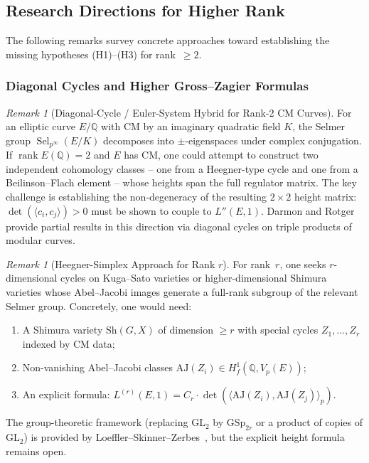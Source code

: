 \documentclass[aps,prd,twocolumn,superscriptaddress,nofootinbib,floatfix]{revtex4-2}
\theoremstyle{definition}
\theoremstyle{remark}
\newtheorem{remark}[theorem]{Remark}
\DeclareMathOperator{\rank}{rank}
\DeclareMathOperator{\Sel}{Sel}
\begin{document}
\subsection{Research Directions for Higher Rank}
\label{sec:higher_rank_directions}

The following remarks survey concrete approaches toward establishing the missing hypotheses (H1)--(H3) for rank~$\geq 2$.

\subsubsection{Diagonal Cycles and Higher Gross--Zagier Formulas}

\begin{remark}[Diagonal-Cycle / Euler-System Hybrid for Rank-2 CM Curves]
\label{rem:diagonal-euler}
For an elliptic curve $E/\mathbb{Q}$ with CM by an imaginary quadratic field $K$, the Selmer group $\Sel_{p^\infty}(E/K)$ decomposes into $\pm$-eigenspaces under complex conjugation. If $\rank E(\mathbb{Q}) = 2$ and $E$ has CM, one could attempt to construct two independent cohomology classes -- one from a Heegner-type cycle and one from a Beilinson--Flach element -- whose heights span the full regulator matrix. The key challenge is establishing the non-degeneracy of the resulting $2 \times 2$ height matrix: $\det(\langle c_i, c_j \rangle) > 0$ must be shown to couple to $L''(E,1)$. Darmon and Rotger~\cite{DarmonRotger2017} provide partial results in this direction via diagonal cycles on triple products of modular curves.
\end{remark}

\begin{remark}[Heegner-Simplex Approach for Rank $r$]
\label{rem:heegner-simplex}
For rank~$r$, one seeks $r$-dimensional cycles on Kuga--Sato varieties or higher-dimensional Shimura varieties whose Abel--Jacobi images generate a full-rank subgroup of the relevant Selmer group. Concretely, one would need:
\begin{enumerate}
\item A Shimura variety $\mathrm{Sh}(G, X)$ of dimension $\geq r$ with special cycles $Z_1, \ldots, Z_r$ indexed by CM data;
\item Non-vanishing Abel--Jacobi classes $\mathrm{AJ}(Z_i) \in H^1_f(\mathbb{Q}, V_p(E))$;
\item An explicit formula: $L^{(r)}(E,1) = C_r \cdot \det(\langle \mathrm{AJ}(Z_i), \allowbreak \mathrm{AJ}(Z_j) \rangle_p)$.
\end{enumerate}
The group-theoretic framework (replacing $\mathrm{GL}_2$ by $\mathrm{GSp}_{2r}$ or a product of copies of $\mathrm{GL}_2$) is provided by Loeffler--Skinner--Zerbes~\cite{LSZ2020}, but the explicit height formula remains open.
\end{remark}
\end{document}
